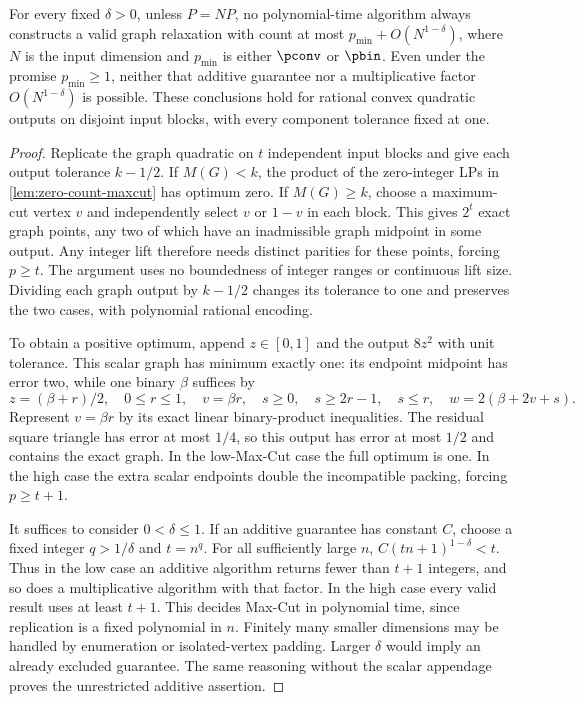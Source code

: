 \begin{theorem}\label{thm:count-hardness}
For every fixed $\delta>0$, unless $P=NP$, no polynomial-time algorithm
always constructs a valid graph relaxation with count at most
$p_{\min}+O(N^{1-\delta})$, where $N$ is the input dimension and
$p_{\min}$ is either $\pconv$ or $\pbin$. Even under the promise
$p_{\min}\ge1$, neither that additive guarantee nor a multiplicative
factor $O(N^{1-\delta})$ is possible. These conclusions hold for
rational convex quadratic outputs on disjoint input blocks, with every
component tolerance fixed at one.
\end{theorem}
\begin{proof}
Replicate the graph quadratic on $t$ independent input blocks and give
each output tolerance $k-1/2$. If $M(G)<k$, the product of the zero-integer
LPs in \cref{lem:zero-count-maxcut} has optimum zero. If $M(G)\ge k$,
choose a maximum-cut vertex $v$ and independently select $v$ or $1-v$
in each block. This gives $2^t$ exact graph points, any two of which
have an inadmissible graph midpoint in some output. Any integer lift
therefore needs distinct parities for these points, forcing $p\ge t$.
The argument uses no boundedness of integer ranges or continuous lift
size. Dividing each graph output by $k-1/2$ changes its tolerance to
one and preserves the two cases, with polynomial rational encoding.

To obtain a positive optimum, append $z\in[0,1]$ and the output $8z^2$
with unit tolerance. This scalar graph has minimum exactly one: its
endpoint midpoint has error two, while one binary $\beta$ suffices by
\[
 z=(\beta+r)/2,\quad 0\le r\le1,\quad v=\beta r,
 \quad s\ge0,\quad s\ge2r-1,\quad s\le r,
 \quad w=2(\beta+2v+s).
\]
Represent $v=\beta r$ by its exact linear binary-product inequalities.
The residual square triangle has error at most $1/4$, so this output
has error at most $1/2$ and contains the exact graph. In the low-Max-Cut
case the full optimum is one. In the high case the extra scalar endpoints
double the incompatible packing, forcing $p\ge t+1$.

It suffices to consider $0<\delta\le1$. If an additive guarantee has
constant $C$, choose a fixed integer $q>1/\delta$ and $t=n^q$.
For all sufficiently large $n$,
$C(tn+1)^{1-\delta}<t$. Thus in the low case an additive algorithm
returns fewer than $t+1$ integers, and so does a multiplicative algorithm
with that factor. In the high case every valid result uses at least
$t+1$. This decides Max-Cut in polynomial time, since replication is
a fixed polynomial in $n$. Finitely many smaller dimensions may be
handled by enumeration or isolated-vertex padding. Larger $\delta$
would imply an already excluded guarantee. The same reasoning without
the scalar appendage proves the unrestricted additive assertion.
\end{proof}

